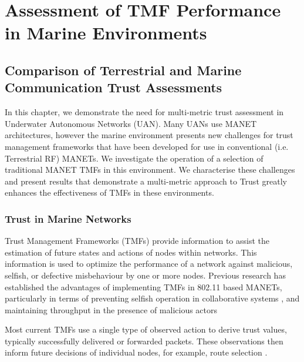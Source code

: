 \def\ChapterTitle{Assessment of TMF Performance in Marine Environments}

\ifx\ifthesis\undefined

\else
\chapter{\ChapterTitle}
\label{Chapter\thechapter}
\fi



\section{Comparison of Terrestrial and Marine Communication Trust Assessments}

In this chapter, we demonstrate the need for multi-metric trust assessment in Underwater Autonomous Networks (UAN).
Many UANs use MANET architectures, however the marine environment presents new challenges for trust management frameworks that have been developed for use in conventional (i.e. Terrestrial RF) MANETs.
We investigate the operation of a selection of traditional MANET TMFs in this environment.
We characterise these challenges and present results that demonstrate a multi-metric approach to Trust greatly enhances the effectiveness of TMFs in these environments.

\subsection{Trust in Marine Networks}\label{sec:trust_in_marine}



Trust Management Frameworks (TMFs) provide information to assist the estimation of future states and actions of nodes within networks.
This information is used to optimize the performance of a network against malicious, selfish, or defective misbehaviour by one or more nodes.
Previous research has established the advantages of implementing TMFs in 802.11 based MANETs, particularly in terms of preventing selfish operation in collaborative systems \cite{Li2007}, and maintaining throughput in the presence of malicious actors \cite{Buchegger2002}

Most current TMFs use a single type of observed action to derive trust values, typically successfully delivered or forwarded packets. 
These observations then inform future decisions of individual nodes, for example, route selection \cite{Li2008}.

